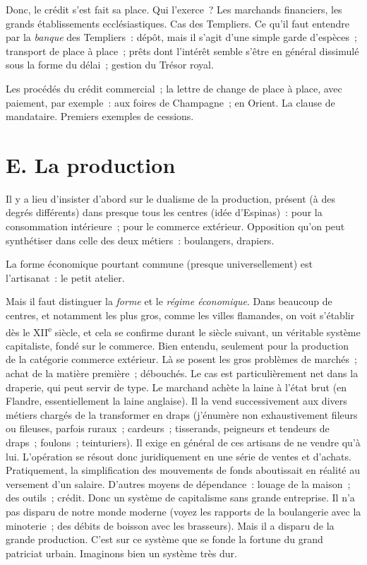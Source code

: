 \documentclass[french,twoside]{book} %
\begin{document}
\noindent Donc, le crédit s’est fait sa place. Qui l’exerce ? Les marchands financiers, les grands établissements ecclésiastiques. Cas des Templiers. Ce qu’il faut entendre par la \emph{banque} des Templiers : dépôt, mais il s’agit d’une simple garde d’espèces ; transport de place à place ; prêts dont l’intérêt semble s’être en général dissimulé sous la forme du délai ; gestion du Trésor royal.\par
Les procédés du crédit commercial ; la lettre de change de place à place, avec paiement, par exemple : aux foires de Champagne ; en Orient. La clause de mandataire. Premiers exemples de cessions.
\section[{E. La production}]{E. La production}
\label{c09e}
\noindent Il y a lieu d’insister d’abord sur le dualisme de la production, présent (à des degrés différents) dans presque tous les centres (idée d’Espinas) : pour la consommation intérieure ; pour le commerce extérieur. Opposition qu’on peut synthétiser dans celle des deux métiers : boulangers, drapiers.\par
La forme économique pourtant commune (presque universellement) est l’artisanat : le petit atelier.\par
Mais il faut distinguer la \emph{forme} et le \emph{régime économique}. Dans beaucoup de centres, et notamment les plus gros, comme les villes flamandes, on voit s’établir dès le XII\textsuperscript{e} siècle, et cela se confirme durant le siècle suivant, un véritable système capitaliste, fondé sur le commerce. Bien entendu, seulement pour la production de la catégorie commerce extérieur. Là se posent les gros problèmes de marchés ; achat de la matière première ; débouchés. Le cas est particulièrement net dans la draperie, qui peut servir de type. Le marchand achète la laine à l’état brut (en Flandre, essentiellement la laine anglaise). Il la vend successivement aux divers métiers  
\label{p96} chargés de la transformer en draps (j’énumère non exhaustivement fileurs ou fileuses, parfois ruraux ; cardeurs ; tisserands, peigneurs et tendeurs de draps ; foulons ; teinturiers). Il exige en général de ces artisans de ne vendre qu’à lui. L’opération se résout donc juridiquement en une série de ventes et d’achats. Pratiquement, la simplification des mouvements de fonds aboutissait en réalité au versement d’un salaire. D’autres moyens de dépendance : louage de la maison ; des outils ; crédit. Donc un système de capitalisme sans grande entreprise. Il n’a pas disparu de notre monde moderne (voyez les rapports de la boulangerie avec la minoterie ; des débits de boisson avec les brasseurs). Mais il a disparu de la grande production. C’est sur ce système que se fonde la fortune du grand patriciat urbain. Imaginons bien un système très dur.\par
\end{document}
